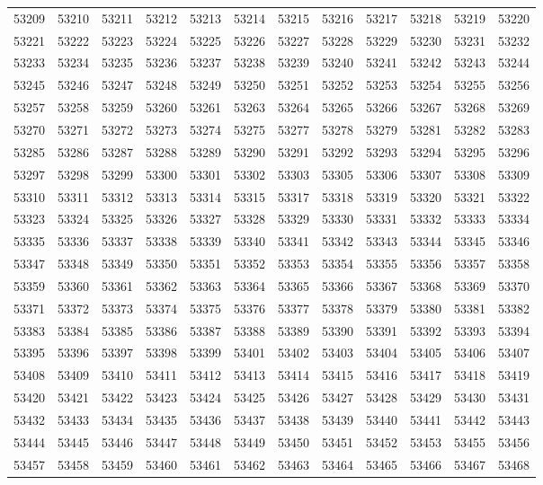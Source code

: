 \begin{center}
\begin{longtable}{llllllllllll}
53209 &53210 &53211 &53212 &53213 &53214 &53215 &53216 &53217 &53218 &53219 &53220 \\
53221 &53222 &53223 &53224 &53225 &53226 &53227 &53228 &53229 &53230 &53231 &53232 \\
53233 &53234 &53235 &53236 &53237 &53238 &53239 &53240 &53241 &53242 &53243 &53244 \\
53245 &53246 &53247 &53248 &53249 &53250 &53251 &53252 &53253 &53254 &53255 &53256 \\
53257 &53258 &53259 &53260 &53261 &53263 &53264 &53265 &53266 &53267 &53268 &53269 \\
53270 &53271 &53272 &53273 &53274 &53275 &53277 &53278 &53279 &53281 &53282 &53283 \\
53285 &53286 &53287 &53288 &53289 &53290 &53291 &53292 &53293 &53294 &53295 &53296 \\
53297 &53298 &53299 &53300 &53301 &53302 &53303 &53305 &53306 &53307 &53308 &53309 \\
53310 &53311 &53312 &53313 &53314 &53315 &53317 &53318 &53319 &53320 &53321 &53322 \\
53323 &53324 &53325 &53326 &53327 &53328 &53329 &53330 &53331 &53332 &53333 &53334 \\
53335 &53336 &53337 &53338 &53339 &53340 &53341 &53342 &53343 &53344 &53345 &53346 \\
53347 &53348 &53349 &53350 &53351 &53352 &53353 &53354 &53355 &53356 &53357 &53358 \\
53359 &53360 &53361 &53362 &53363 &53364 &53365 &53366 &53367 &53368 &53369 &53370 \\
53371 &53372 &53373 &53374 &53375 &53376 &53377 &53378 &53379 &53380 &53381 &53382 \\
53383 &53384 &53385 &53386 &53387 &53388 &53389 &53390 &53391 &53392 &53393 &53394 \\
53395 &53396 &53397 &53398 &53399 &53401 &53402 &53403 &53404 &53405 &53406 &53407 \\
53408 &53409 &53410 &53411 &53412 &53413 &53414 &53415 &53416 &53417 &53418 &53419 \\
53420 &53421 &53422 &53423 &53424 &53425 &53426 &53427 &53428 &53429 &53430 &53431 \\
53432 &53433 &53434 &53435 &53436 &53437 &53438 &53439 &53440 &53441 &53442 &53443 \\
53444 &53445 &53446 &53447 &53448 &53449 &53450 &53451 &53452 &53453 &53455 &53456 \\
53457 &53458 &53459 &53460 &53461 &53462 &53463 &53464 &53465 &53466 &53467 &53468 \\

\end{longtable}
\end{center}
